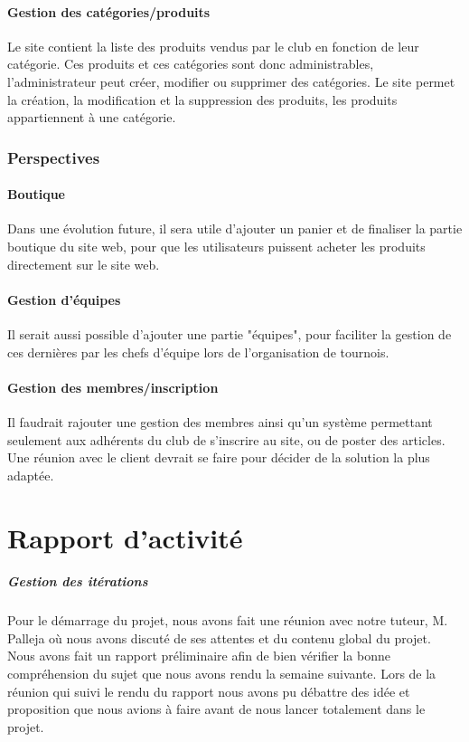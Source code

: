 \documentclass[a4paper,12pt, notitlepage]{report}
\begin{document}
\subsection{Gestion des catégories/produits}
Le site contient la liste des produits vendus par le club en fonction de leur catégorie. 
Ces produits et ces catégories sont donc administrables, l’administrateur peut créer, modifier ou supprimer des catégories. Le site permet la création, la modification et la suppression des produits, les produits appartiennent à une catégorie.

\section{Perspectives}
\subsection{Boutique}
Dans une évolution future, il sera utile d’ajouter un panier et de finaliser la partie boutique du site web, pour que les utilisateurs puissent acheter les produits directement sur le site web.
\subsection{Gestion d'équipes}
Il serait aussi possible d’ajouter une partie "équipes", pour faciliter la gestion de ces dernières par les chefs d’équipe lors de l’organisation de tournois.
\subsection{Gestion des membres/inscription}
Il faudrait rajouter une gestion des membres ainsi qu’un système permettant seulement aux adhérents du club de s’inscrire au site, ou de poster des articles. Une réunion avec le client devrait se faire pour décider de la solution la plus adaptée.

\part{Rapport d'activité}
\subsubsection{Gestion des itérations}
Pour le démarrage du projet, nous avons fait une réunion avec notre tuteur, M. Palleja où nous avons discuté de ses attentes et du contenu global du projet. Nous avons fait un rapport préliminaire afin de bien vérifier la bonne compréhension du sujet que nous avons rendu la semaine suivante. Lors de la réunion qui suivi le rendu du rapport nous avons pu débattre des idée et proposition que nous avions à faire avant de nous lancer totalement dans le projet.
\end{document}
